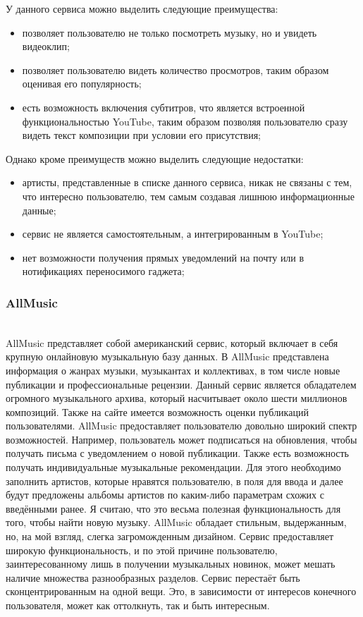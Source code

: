 У данного сервиса можно выделить следующие преимущества:

\begin{itemize}
  \item позволяет пользователю не только посмотреть музыку, но и увидеть видеоклип;
  \item позволяет пользователю видеть количество просмотров, таким образом оценивая его популярность;
  \item есть возможность включения субтитров, что является встроенной функциональностью YouTube, таким образом позволяя пользователю сразу видеть текст композиции при условии его присутствия;
\end{itemize}

Однако кроме преимуществ можно выделить следующие недостатки:

\begin{itemize}
  \item артисты, представленные в списке данного сервиса, никак не связаны с тем, что интересно пользователю, тем самым создавая лишнюю информационные данные;
  \item сервис не является самостоятельным, а интегрированным в YouTube;
  \item нет возможности получения прямых уведомлений на почту или в нотификациях переносимого гаджета;
\end{itemize}

\subsubsection{AllMusic}
\label{sub:domain:analogues_review:allmusic}
~\\

AllMusic представляет собой американский сервис, который включает в себя крупную онлайновую музыкальную базу данных. В AllMusic представлена информация о жанрах музыки, музыкантах и коллективах, в том числе новые публикации и профессиональные рецензии. Данный сервис является обладателем огромного музыкального архива, который насчитывает около шести миллионов композиций. Также на сайте имеется возможность оценки публикаций пользователями.
AllMusic предоставляет пользователю довольно широкий спектр возможностей. Например, пользователь может подписаться на обновления, чтобы получать письма с уведомлением о новой публикации. Также есть возможность получать индивидуальные музыкальные рекомендации. Для этого необходимо заполнить артистов, которые нравятся пользователю, в поля для ввода и далее будут предложены альбомы артистов по каким-либо параметрам схожих с введёнными ранее. Я считаю, что это весьма полезная функциональность для того, чтобы найти новую музыку.
AllMusic обладает стильным, выдержанным, но, на мой взгляд, слегка загроможденным дизайном. Сервис предоставляет широкую функциональность, и по этой причине пользователю, заинтересованному лишь в получении музыкальных новинок, может мешать наличие множества разнообразных разделов. Сервис перестаёт быть сконцентрированным на одной вещи. Это, в зависимости от интересов конечного пользователя, может как оттолкнуть, так и быть интересным.

